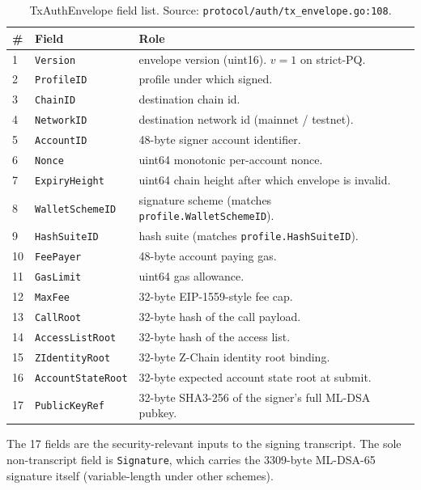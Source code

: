 \begin{table}[H]
\centering
\caption{TxAuthEnvelope field list. Source:
\texttt{protocol/auth/tx\_envelope.go:108}.}
\label{tab:tx-auth-fields}
\begin{tabular}{llp{7cm}}
\toprule
\# & Field & Role \\
\midrule
1  & \texttt{Version}          & envelope version (uint16). $v=1$ on strict-PQ. \\
2  & \texttt{ProfileID}        & profile under which signed. \\
3  & \texttt{ChainID}          & destination chain id. \\
4  & \texttt{NetworkID}        & destination network id (mainnet / testnet). \\
5  & \texttt{AccountID}        & 48-byte signer account identifier. \\
6  & \texttt{Nonce}            & uint64 monotonic per-account nonce. \\
7  & \texttt{ExpiryHeight}     & uint64 chain height after which envelope is invalid. \\
8  & \texttt{WalletSchemeID}   & signature scheme (matches \texttt{profile.WalletSchemeID}). \\
9  & \texttt{HashSuiteID}      & hash suite (matches \texttt{profile.HashSuiteID}). \\
10 & \texttt{FeePayer}         & 48-byte account paying gas. \\
11 & \texttt{GasLimit}         & uint64 gas allowance. \\
12 & \texttt{MaxFee}           & 32-byte EIP-1559-style fee cap. \\
13 & \texttt{CallRoot}         & 32-byte hash of the call payload. \\
14 & \texttt{AccessListRoot}   & 32-byte hash of the access list. \\
15 & \texttt{ZIdentityRoot}    & 32-byte Z-Chain identity root binding. \\
16 & \texttt{AccountStateRoot} & 32-byte expected account state root at submit. \\
17 & \texttt{PublicKeyRef}     & 32-byte SHA3-256 of the signer's full ML-DSA pubkey. \\
\bottomrule
\end{tabular}
\end{table}

The 17 fields are the security-relevant inputs to the signing transcript. The
sole non-transcript field is \texttt{Signature}, which carries the
3309-byte ML-DSA-65 signature itself (variable-length under other schemes).

